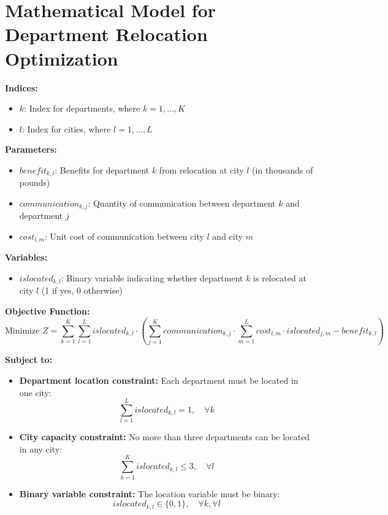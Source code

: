 \documentclass{article}
\begin{document}
\section*{Mathematical Model for Department Relocation Optimization}

\textbf{Indices:}
\begin{itemize}
    \item $k$: Index for departments, where $k = 1, \ldots, K$
    \item $l$: Index for cities, where $l = 1, \ldots, L$
\end{itemize}

\textbf{Parameters:}
\begin{itemize}
    \item $benefit_{k,l}$: Benefits for department $k$ from relocation at city $l$ (in thousands of pounds)
    \item $communication_{k,j}$: Quantity of communication between department $k$ and department $j$
    \item $cost_{l,m}$: Unit cost of communication between city $l$ and city $m$
\end{itemize}

\textbf{Variables:}
\begin{itemize}
    \item $islocated_{k,l}$: Binary variable indicating whether department $k$ is relocated at city $l$ (1 if yes, 0 otherwise)
\end{itemize}

\textbf{Objective Function:}
\[
\text{Minimize } Z = \sum_{k=1}^{K} \sum_{l=1}^{L} islocated_{k,l} \cdot \left( \sum_{j=1}^{K} communication_{k,j} \cdot \sum_{m=1}^{L} cost_{l,m} \cdot islocated_{j,m} - benefit_{k,l} \right)
\]

\textbf{Subject to:}
\begin{itemize}
    \item \textbf{Department location constraint:} Each department must be located in one city:
    \[
    \sum_{l=1}^{L} islocated_{k,l} = 1, \quad \forall k
    \]

    \item \textbf{City capacity constraint:} No more than three departments can be located in any city:
    \[
    \sum_{k=1}^{K} islocated_{k,l} \leq 3, \quad \forall l
    \]

    \item \textbf{Binary variable constraint:} The location variable must be binary:
    \[
    islocated_{k,l} \in \{0, 1\}, \quad \forall k, \forall l
    \]
\end{itemize}
\end{document}
